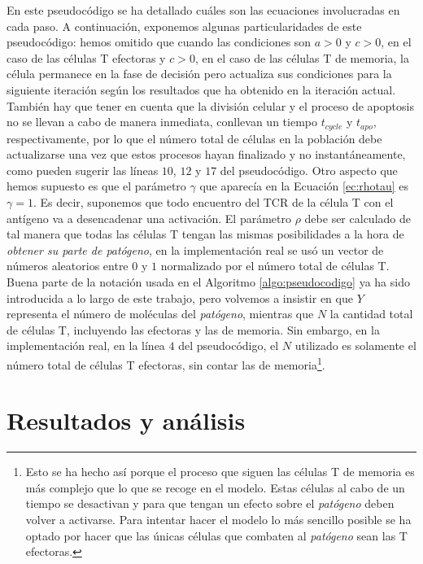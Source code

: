 En este pseudocódigo se ha detallado cuáles son las ecuaciones involucradas en cada paso. A continuación, exponemos algunas particularidades de este pseudocódigo: hemos omitido que cuando las condiciones son $a > 0$ y $c > 0$, en el caso de las células T efectoras y $c > 0$, en el caso de las células T de memoria, la célula permanece en la fase de decisión pero actualiza sus condiciones para la siguiente iteración según los resultados que ha obtenido en la iteración actual. También hay que tener en cuenta que la división celular y el proceso de apoptosis no se llevan a cabo de manera inmediata, conllevan un tiempo $t_{cycle}$ y $t_{apo}$, respectivamente, por lo que el número total de células en la población debe actualizarse una vez que estos procesos hayan finalizado y no instantáneamente, como pueden sugerir las líneas $10$, $12$ y $17$ del pseudocódigo. Otro aspecto que hemos supuesto es que el parámetro $\gamma$ que aparecía en la Ecuación \ref{ec:rhotau} es $\gamma = 1$. Es decir, suponemos que todo encuentro del TCR de la célula T con el antígeno va a desencadenar una activación. El parámetro $\rho$ debe ser calculado de tal manera que todas las células T tengan las mismas posibilidades a la hora de \textit{obtener su parte de \textit{patógeno}}, en la implementación real se usó un vector de números aleatorios entre $0$ y $1$ normalizado por el número total de células T. Buena parte de la notación usada en el Algoritmo \ref{algo:pseudocodigo} ya ha sido introducida a lo largo de este trabajo, pero volvemos a insistir en que $Y$ representa el número de moléculas del \textit{patógeno}, mientras que $N$ la cantidad total de células T, incluyendo las efectoras y las de memoria. Sin embargo, en la implementación real, en la línea $4$ del pseudocódigo, el $N$ utilizado es solamente el número total de células T efectoras, sin contar las de memoria\footnote{Esto se ha hecho así porque el proceso que siguen las células T de memoria es más complejo que lo que se recoge en el modelo. Estas células al cabo de un tiempo se desactivan y para que tengan un efecto sobre el \textit{patógeno} deben volver a activarse. Para intentar hacer el modelo lo más sencillo posible se ha optado por hacer que las únicas células que combaten al \textit{patógeno} sean las T efectoras.}.


\section{Resultados y análisis}
\label{sec:simulacionesMicro}

